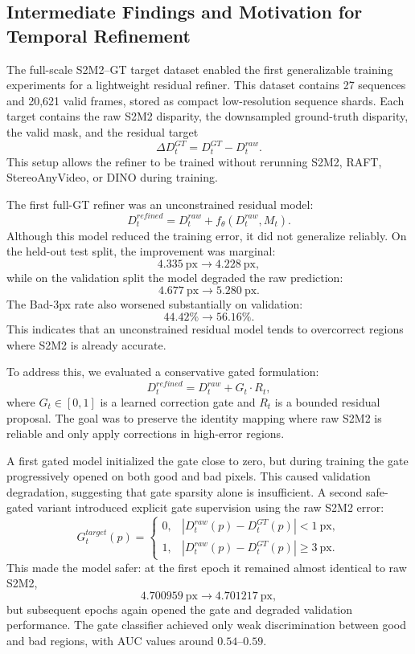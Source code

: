 \documentclass[11pt,a4paper]{article}
\begin{document}
\subsection{Intermediate Findings and Motivation for Temporal Refinement}

The full-scale S2M2--GT target dataset enabled the first generalizable training
experiments for a lightweight residual refiner. This dataset contains 27
sequences and 20,621 valid frames, stored as compact low-resolution sequence
shards. Each target contains the raw S2M2 disparity, the downsampled
ground-truth disparity, the valid mask, and the residual target
\[
\Delta D_t^{GT} = D_t^{GT} - D_t^{raw}.
\]
This setup allows the refiner to be trained without rerunning S2M2, RAFT,
StereoAnyVideo, or DINO during training.

The first full-GT refiner was an unconstrained residual model:
\[
D_t^{refined} = D_t^{raw} + f_{\theta}(D_t^{raw}, M_t).
\]
Although this model reduced the training error, it did not generalize reliably.
On the held-out test split, the improvement was marginal:
\[
4.335~\mathrm{px} \rightarrow 4.228~\mathrm{px},
\]
while on the validation split the model degraded the raw prediction:
\[
4.677~\mathrm{px} \rightarrow 5.280~\mathrm{px}.
\]
The Bad-3px rate also worsened substantially on validation:
\[
44.42\% \rightarrow 56.16\%.
\]
This indicates that an unconstrained residual model tends to overcorrect regions
where S2M2 is already accurate.

To address this, we evaluated a conservative gated formulation:
\[
D_t^{refined}
=
D_t^{raw}
+
G_t \cdot R_t,
\]
where \(G_t \in [0,1]\) is a learned correction gate and \(R_t\) is a bounded
residual proposal. The goal was to preserve the identity mapping where raw S2M2
is reliable and only apply corrections in high-error regions.

A first gated model initialized the gate close to zero, but during training the
gate progressively opened on both good and bad pixels. This caused validation
degradation, suggesting that gate sparsity alone is insufficient. A second
safe-gated variant introduced explicit gate supervision using the raw S2M2 error:
\[
G_t^{target}(p)
=
\begin{cases}
0, & |D_t^{raw}(p) - D_t^{GT}(p)| < 1~\mathrm{px}, \\
1, & |D_t^{raw}(p) - D_t^{GT}(p)| \geq 3~\mathrm{px}.
\end{cases}
\]
This made the model safer: at the first epoch it remained almost identical to
raw S2M2,
\[
4.700959~\mathrm{px} \rightarrow 4.701217~\mathrm{px},
\]
but subsequent epochs again opened the gate and degraded validation performance.
The gate classifier achieved only weak discrimination between good and bad
regions, with AUC values around \(0.54\)--\(0.59\).
\end{document}

